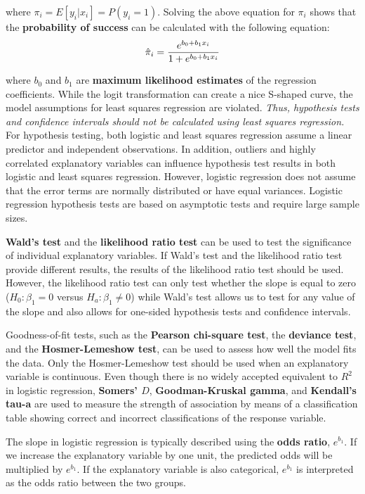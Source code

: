 \documentclass[
]{report}
\begin{document}
where \(\pi_i = E[y_i | x_i] = P(y_i = 1)\). Solving the above equation for \(\pi_i\) shows that the \textbf{probability of success} can be calculated with the following equation:
\begin{align}
\hat{\pi}_i = \frac{e^{b_0 + b_1 x_i}}{1 + e^{b_0 + b_1 x_i}}
\notag
\end{align}

where \(b_0\) and \(b_1\) are \textbf{maximum likelihood estimates} of the regression coefficients. While the logit transformation can create a nice S-shaped curve, the model assumptions for least squares regression are violated. \textit{Thus, hypothesis tests and confidence intervals should not be calculated using least squares regression.} For hypothesis testing, both logistic and least squares regression assume a linear predictor and independent observations. In addition, outliers and highly correlated explanatory variables can influence hypothesis test results in both logistic and least squares regression. However, logistic regression does not assume that the error terms are normally distributed or have equal variances. Logistic regression hypothesis tests are based on asymptotic tests and require large sample sizes.

\textbf{Wald's test} and the \textbf{likelihood ratio test} can be used to test the significance of individual explanatory variables. If Wald's test and the likelihood ratio test provide different results, the results of the likelihood ratio test should be used. However, the likelihood ratio test can only test whether the slope is equal to zero (\(H_0: \beta_1 = 0\) versus \(H_a: \beta_1 \neq 0\)) while Wald's test allows us to test for any value of the slope and also allows for one-sided hypothesis tests and confidence intervals.

Goodness-of-fit tests, such as the \textbf{Pearson chi-square test}, the \textbf{deviance test}, and the \textbf{Hosmer-Lemeshow test}, can be used to assess how well the model fits the data. Only the Hosmer-Lemeshow test should be used when an explanatory variable is continuous. Even though there is no widely accepted equivalent to \(R^2\) in logistic regression, \textbf{Somers' \(D\)}, \textbf{Goodman-Kruskal gamma}, and \textbf{Kendall's tau-a} are used to measure the strength of association by means of a classification table showing correct and incorrect classifications of the response variable.

The slope in logistic regression is typically described using the \textbf{odds ratio}, \(e^{b_1}\). If we increase the explanatory variable by one unit, the predicted odds will be multiplied by \(e^{b_1}\). If the explanatory variable is also categorical, \(e^{b_1}\) is interpreted as the odds ratio between the two groups.
\end{document}

